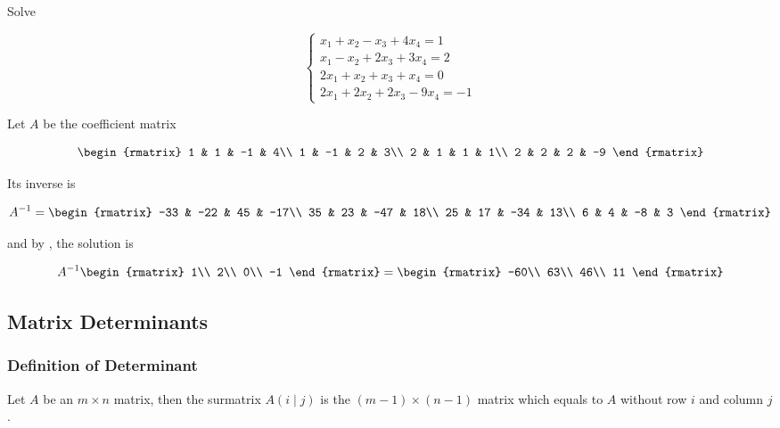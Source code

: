 \documentclass[a4paper,12pt]{article}
\begin{document}
\begin{exm}
  Solve

  $$\begin{cases}
    x_{1}+x_{2}-x_{3}+4x_{4}=1\\
    x_{1}-x_{2}+2x_{3}+3x_{4}=2\\
    2x_{1}+x_{2}+x_{3}+x_{4}=0\\
    2x_{1}+2x_{2}+2x_{3}-9x_{4}=-1
  \end{cases}$$\s

  \ans Let $A$ be the coefficient matrix

  $$\begin{rmatrix}
    1 & 1 & -1 & 4\\
    1 & -1 & 2 & 3\\
    2 & 1 & 1 & 1\\
    2 & 2 & 2 & -9
  \end{rmatrix}$$\s

  Its inverse is

  $$A^{-1}=\begin{rmatrix}
    -33 & -22 & 45 & -17\\
    35 & 23 & -47 & 18\\
    25 & 17 & -34 & 13\\
    6 & 4 & -8 & 3
  \end{rmatrix}$$\s

  and by \rthm[\sctr{1}], the solution is

  $$A^{-1}\begin{rmatrix}
    1\\
    2\\
    0\\
    -1
  \end{rmatrix}=\begin{rmatrix}
    -60\\
    63\\
    46\\
    11
  \end{rmatrix}$$
\end{exm}

\subsection{Matrix Determinants}
\subsubsection{Definition of Determinant}
\begin{dft}
  Let $A$ be an $m\times n$ matrix, then the surmatrix $A(i\!\mid\!j)$ is the $(m-1)\times(n-1)$ matrix which equals to $A$ without row $i$ and column $j$.
\end{dft}\n
\end{document}
